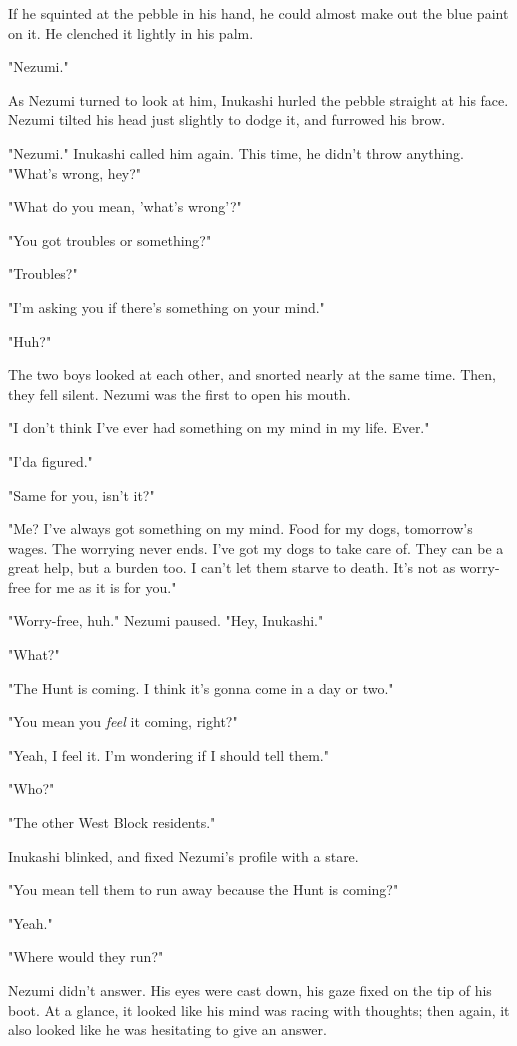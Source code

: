 If he squinted at the pebble in his hand, he could almost make out the
blue paint on it. He clenched it lightly in his palm.

"Nezumi."

As Nezumi turned to look at him, Inukashi hurled the pebble straight at
his face. Nezumi tilted his head just slightly to dodge it, and furrowed
his brow.

"Nezumi." Inukashi called him again. This time, he didn't throw
anything. "What's wrong, hey?"

"What do you mean, 'what's wrong'?"

"You got troubles or something?"

"Troubles?"

"I'm asking you if there's something on your mind."

"Huh?"

The two boys looked at each other, and snorted nearly at the same time.
Then, they fell silent. Nezumi was the first to open his mouth.

"I don't think I've ever had something on my mind in my life. Ever."

"I'da figured."

"Same for you, isn't it?"

"Me? I've always got something on my mind. Food for my dogs, tomorrow's
wages. The worrying never ends. I've got my dogs to take care of. They
can be a great help, but a burden too. I can't let them starve to death.
It's not as worry-free for me as it is for you."

"Worry-free, huh." Nezumi paused. "Hey, Inukashi."

"What?"

"The Hunt is coming. I think it's gonna come in a day or two."

"You mean you \emph{feel} it coming, right?"

"Yeah, I feel it. I'm wondering if I should tell them."

"Who?"

"The other West Block residents."

Inukashi blinked, and fixed Nezumi's profile with a stare.

"You mean tell them to run away because the Hunt is coming?"

"Yeah."

"Where would they run?"

Nezumi didn't answer. His eyes were cast down, his gaze fixed on the tip
of his boot. At a glance, it looked like his mind was racing with
thoughts; then again, it also looked like he was hesitating to give an
answer.

